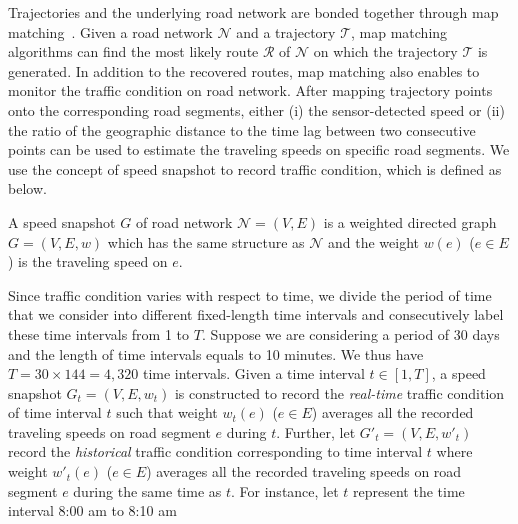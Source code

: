 Trajectories and the underlying road network are bonded together through map matching~\cite{Newson2009MM,WuMSZZCWKDD16}. Given a road network $\mathcal{N}$ and a trajectory $\mathcal{T}$, map matching algorithms can find the most likely route $\mathcal{R}$ of $\mathcal{N}$ on which the trajectory $\mathcal{T}$ is generated.
In addition to the recovered routes, map matching also enables to monitor the traffic condition on road network. After mapping trajectory points onto the corresponding road segments, either (i) the sensor-detected speed or (ii) the ratio of the geographic distance to the time lag between two consecutive points can be used to estimate the traveling speeds on specific road segments.
We use the concept of speed snapshot to record traffic condition, which is defined as below.

\begin{definition}A speed snapshot $G$ of road network $\mathcal{N}=(V, E)$ is a weighted directed graph $G=(V,E,w)$ which has the same structure as $\mathcal{N}$ and the weight $w(e)$ ($e\in E$) is the traveling speed on $e$.
\end{definition}

Since traffic condition varies with respect to time, we divide the period of time that we consider into different fixed-length time intervals and consecutively label these time intervals from 1 to $T$. Suppose we are considering a period of 30 days and the length of time intervals equals to 10 minutes. We thus have $T=30\times144=4,320$ time intervals.
Given a time interval $t\in[1,T]$, a speed snapshot $G_t=(V,E,w_t)$ is constructed to record the {\em real-time} traffic condition of time interval $t$ such that weight $w_t(e)$ ($e\in E$) averages all the recorded traveling speeds on road segment $e$ during $t$.
Further, let $G'_t=(V,E,w'_t)$ record the {\em historical} traffic condition corresponding to time interval $t$ where weight $w'_t(e)$ ($e\in E$) averages all the recorded traveling speeds on road segment $e$ during the same time as $t$. For instance, let $t$ represent the time interval 8:00 am to 8:10 am

